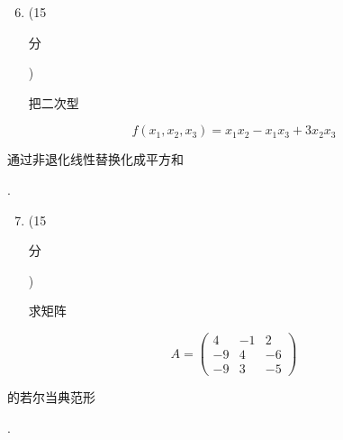 \documentclass[10pt]{article}
\begin{document}
\begin{enumerate}
  \setcounter{enumi}{5}
  \item (15 \begin{CJK}{UTF8}{mj}分\end{CJK}) \begin{CJK}{UTF8}{mj}把二次型\end{CJK}
\end{enumerate}
$$
f\left(x_{1}, x_{2}, x_{3}\right)=x_{1} x_{2}-x_{1} x_{3}+3 x_{2} x_{3}
$$
\begin{CJK}{UTF8}{mj}通过非退化线性替换化成平方和\end{CJK}.

\begin{enumerate}
  \setcounter{enumi}{6}
  \item (15 \begin{CJK}{UTF8}{mj}分\end{CJK}) \begin{CJK}{UTF8}{mj}求矩阵\end{CJK}
\end{enumerate}
$$
A=\left(\begin{array}{ccc}
4 & -1 & 2 \\
-9 & 4 & -6 \\
-9 & 3 & -5
\end{array}\right)
$$
\begin{CJK}{UTF8}{mj}的若尔当典范形\end{CJK}.
\end{document}
